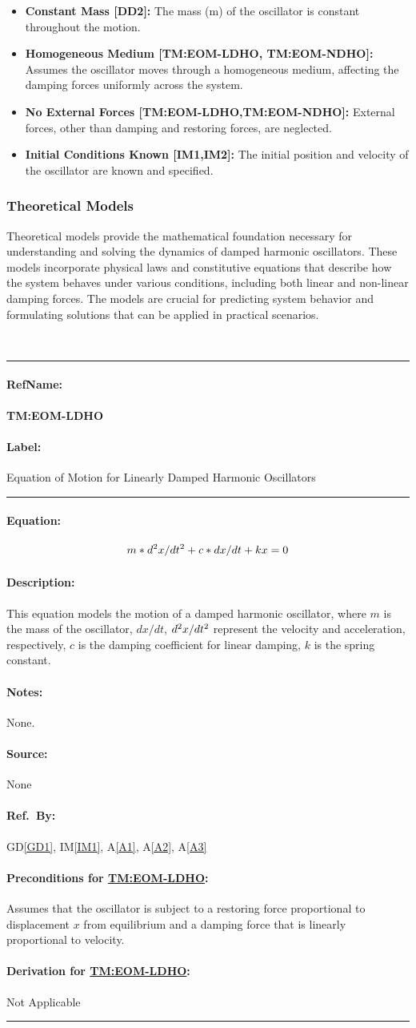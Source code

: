 \documentclass[12pt]{article}
\newcommand{\dref}[1]{GD\ref{#1}}
\newcounter{assumpnum} %
\newcommand{\aref}[1]{A\ref{#1}}
\newcommand{\iref}[1]{IM\ref{#1}}
\newcommand{\deftheory}[9][Not Applicable]
{
\newpage
\noindent \rule{\textwidth}{0.5mm}

\paragraph{RefName: } \textbf{#2} \phantomsection 
\label{#2}

\paragraph{Label:} #3

\noindent \rule{\textwidth}{0.5mm}

\paragraph{Equation:}

#4

\paragraph{Description:}

#5

\paragraph{Notes:}

#6

\paragraph{Source:}

#7

\paragraph{Ref.\ By:}

#8

\paragraph{Preconditions for \hyperref[#2]{#2}:}
\label{#2_precond}

#9

\paragraph{Derivation for \hyperref[#2]{#2}:}
\label{#2_deriv}

#1

\noindent \rule{\textwidth}{0.5mm}

}
\begin{document}
\begin{itemize}
\item[A\refstepcounter{assumpnum}\theassumpnum \label{A1}:]
\textbf{Constant Mass [DD2]:} The mass (m) of the oscillator is constant throughout the motion.
\item[A\refstepcounter{assumpnum}\theassumpnum \label{A2}:]
\textbf{Homogeneous Medium [TM:EOM-LDHO, TM:EOM-NDHO]:} Assumes the oscillator moves through a homogeneous medium, affecting the damping forces uniformly across the system.
\item[A\refstepcounter{assumpnum}\theassumpnum \label{A3}:]
\textbf{No External Forces [TM:EOM-LDHO,TM:EOM-NDHO]:} External forces, other 
than damping and restoring forces, are neglected.
\item[A\refstepcounter{assumpnum}\theassumpnum \label{A4}:]
\textbf{Initial Conditions Known [IM1,IM2]:} The initial position and velocity of the oscillator are known and specified.
\end{itemize}

\subsubsection{Theoretical Models}\label{sec_theoretical}

Theoretical models provide the mathematical foundation necessary for understanding and solving the dynamics of damped harmonic oscillators. These models incorporate physical laws and constitutive equations that describe how the system behaves under various conditions, including both linear and non-linear damping forces. The models are crucial for predicting system behavior and formulating solutions that can be applied in practical scenarios.

~\newline

\noindent
\deftheory
{TM:EOM-LDHO}
{Equation of Motion for Linearly Damped Harmonic Oscillators}
{
  \begin{equation*}
    m*d\textsuperscript{2}x/dt\textsuperscript{2} + c*dx/dt + kx = 0
  \end{equation*}
}
{
  This equation models the motion of a damped harmonic oscillator, where $m$ is the mass of the oscillator, 
  $dx/dt$, $d\textsuperscript{2}x/dt\textsuperscript{2}$ represent the velocity and acceleration, respectively, 
  $c$ is the damping coefficient for linear damping, $k$ is the spring constant.
}
{
  None.
}
{
  None
}
{
  \dref{GD1}, \iref{IM1}, \aref{A1}, \aref{A2}, \aref{A3}
}
{
  Assumes that the oscillator is subject to a restoring force proportional to displacement $x$ from equilibrium and a damping force that is linearly proportional to velocity.
}
{}
\end{document}
